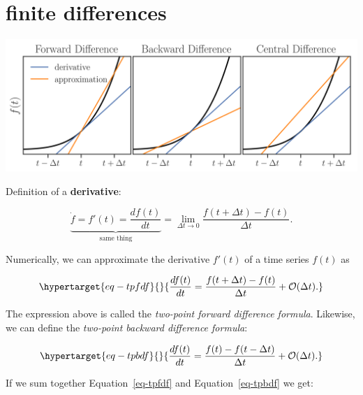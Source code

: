 \documentclass[
  letterpaper,
  DIV=11,
  numbers=noendperiod,
  oneside]{scrreprt}
\begin{document}
\hypertarget{finite-differences}{%
\chapter{finite differences}\label{finite-differences}}

\includegraphics{rates-of-change/central_diff.png}

Definition of a \textbf{derivative}:

\[
\underbrace{\dot{f} = f'(t) = \frac{df(t)}{dt}}_{\text{same thing}} = \lim_{\Delta t \rightarrow 0} \frac{f(t+\Delta t) - f(t)}{\Delta t}.
\]

Numerically, we can approximate the derivative \(f'(t)\) of a time
series \(f(t)\) as

\begin{equation}\protect\hypertarget{eq-tpfdf}{}{
\frac{df(t)}{dt} = \frac{f(t+\Delta t) - f(t)}{\Delta t} + \mathcal{O}(\Delta t).
}\label{eq-tpfdf}\end{equation}


The expression above is called the \emph{two-point forward difference
formula}. Likewise, we can define the \emph{two-point backward
difference formula}:

\begin{equation}\protect\hypertarget{eq-tpbdf}{}{
\frac{df(t)}{dt} = \frac{f(t) - f(t-\Delta t)}{\Delta t} + \mathcal{O}(\Delta t).
}\label{eq-tpbdf}\end{equation}

If we sum together Equation~\ref{eq-tpfdf} and Equation~\ref{eq-tpbdf}
we get:
\end{document}
